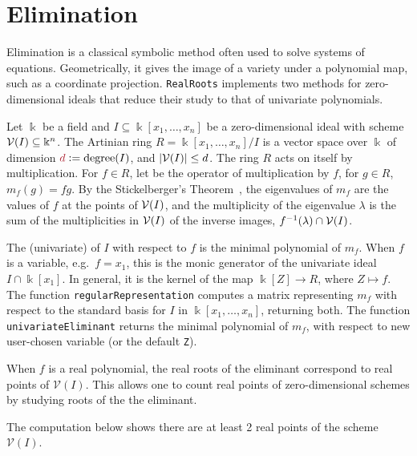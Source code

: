 


\section{Elimination}\label{S:two}

Elimination is a classical symbolic method often used to solve systems of equations.
Geometrically, it gives the image of a variety under a polynomial map, such as a coordinate projection.
\texttt{RealRoots} implements two methods for zero-dimensional ideals that reduce their study to that of univariate polynomials.

Let  $\Bbbk$ be a field and $I\subseteq\Bbbk[x_1,\dotsc,x_n]$ be a zero-dimensional ideal  with scheme $\mathcal{V}(I)\subseteq\Bbbk^n$.
The Artinian ring $R=\Bbbk[x_1,\dotsc,x_n]/I$ is a vector space over $\Bbbk$ of dimension $\defcolor{d}\vcentcolon=\mbox{degree}(I)$, and
$|\mathcal{V}(I)|\leq d$.
The ring $R$ acts on itself by multiplication.
For $f\in R$, let  be the operator of multiplication by $f$, for $g\in R$, $m_f(g)=fg$.
By the Stickelberger's Theorem~\cite{Cox2021}, the eigenvalues of $m_f$ are the values of $f$ at the  points of $\mathcal{V}(I)$,
and the multiplicity of the eigenvalue $\lambda$ is the sum of the multiplicities in $\mathcal{V}(I)$ of the inverse images,
$f^{-1}(\lambda)\cap\mathcal{V}(I)$. 


The (univariate)  of $I$ with respect to $f$ is the minimal polynomial of $m_f$.
When $f$ is a variable, e.g.\ $f=x_1$, this is the monic generator of the univariate ideal $I\cap\Bbbk[x_1]$.
In general, it is the kernel of the map $\Bbbk[Z]\to R$, where $Z\mapsto f$.
The function \texttt{regularRepresentation} computes a matrix representing $m_f$ with respect to the standard basis for $I$ in
$\Bbbk[x_1,\dotsc,x_n]$, returning both.
The function \texttt{univariateEliminant} returns the minimal polynomial of $m_f$, with respect to new user-chosen variable (or the default
\texttt{Z}).
%
\begin{leftbar}

\end{leftbar}
%

When $f$ is a real polynomial, the real roots of the eliminant correspond to real points of $\mathcal{V}(I)$. This allows one to count real points of zero-dimensional schemes by studying roots of the the eliminant. 

The computation below shows there are at least 2 real points of the scheme $\mathcal{V}(I)$. 

